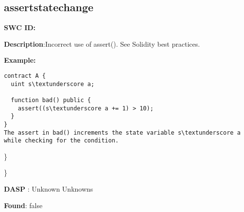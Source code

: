 \documentclass{article}
\begin{document}
\subsection{assert\textunderscore state\textunderscore change} 
\textbf{SWC \textunderscore ID:} 

\textbf{Description}:Incorrect use of assert(). See Solidity best practices.


\textbf{Example:} 
\begin{verbatim}
contract A {
  uint s\textunderscore a;

  function bad() public {
    assert((s\textunderscore a += 1) > 10);
  }
}
The assert in bad() increments the state variable s\textunderscore a while checking for the condition.

\end{verbatim}\} 

\} 

\textbf{DASP} : Unknown Unknowns

\textbf{Found}: false
\end{document}
